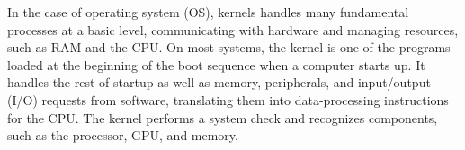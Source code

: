 \documentclass{article}
\begin{document}
In the case of operating system (OS), kernels handles many fundamental processes at a basic level, communicating with hardware and managing resources, such as RAM and the CPU.
On most systems, the kernel is one of the programs loaded at the beginning of the boot sequence when a computer starts up. It handles the rest of startup as well as memory, peripherals, and input/output (I/O) requests from software, translating them into data-processing instructions for the CPU.
The kernel performs a system check and recognizes components, such as the processor, GPU, and memory.
%  
\end{document}

